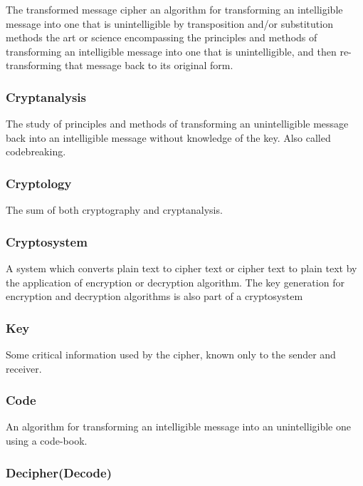 \documentclass[british]{article}
\begin{document}
The transformed message cipher an algorithm for transforming an intelligible
message into one that is unintelligible by transposition and/or substitution
methods the art or science encompassing the principles and methods
of transforming an intelligible message into one that is unintelligible,
and then re-transforming that message back to its original form.

\subsubsection{Cryptanalysis}

The study of principles and methods of transforming an unintelligible
message back into an intelligible message without knowledge of the
key. Also called codebreaking.

\subsubsection{Cryptology}

The sum of both cryptography and cryptanalysis.

\subsubsection{Cryptosystem}

A system which converts plain text to cipher text or cipher text to
plain text by the application of encryption or decryption algorithm.
The key generation for encryption and decryption algorithms is also
part of a cryptosystem

\subsubsection{Key}

Some critical information used by the cipher, known only to the sender
and receiver.

\subsubsection{Code}

An algorithm for transforming an intelligible message into an unintelligible
one using a code-book.

\subsubsection{Decipher(Decode)}
\end{document}
